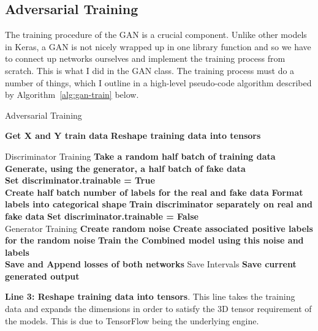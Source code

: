\documentclass[12pt,a4paper,twoside]{report}
\begin{document}
\subsection{Adversarial Training}

The training procedure of the GAN is a crucial component. Unlike other models in Keras, a GAN is not nicely wrapped up in one library function and so we have to connect up networks ourselves and implement the training process from scratch. This is what I did in the GAN class. The training process must do a number of things, which I outline in a high-level pseudo-code algorithm described by Algorithm~\ref{alg:gan-train} below.

\begin{algorithm}[!htbp]
\caption{Adversarial Training }\label{alg:gan-train}
\begin{algorithmic}[1]
	
        \State \textbf{Get X and Y train data}
        \State \textbf{Reshape training data into tensors} 
        \State 
         
		\State
		\Comment Discriminator Training 
		\State \textbf{Take a random half batch of training data}
		\State \textbf{Generate, using the generator, a half batch of fake data}\\
		\State \textbf{Set discriminator.trainable = True}\\
		\State \textbf{Create half batch number of labels for the real and fake data}
		\State \textbf{Format labels into categorical shape}
		\State \textbf{Train discriminator separately on real and fake data}
		\State \textbf{Set discriminator.trainable = False}\\
		\State
		\Comment Generator Training 
		\State \textbf{Create random noise} 
		\State \textbf{Create associated positive labels for the random noise}
		\State \textbf{Train the Combined model using this noise and labels}\\
		\State \textbf{Save and Append losses of both networks }
		\State
		\Comment Save Intervals
			\State \textbf{Save current generated output}
		\EndIf
   	\EndFor
   
\EndProcedure
\end{algorithmic}
\end{algorithm}

\textbf{Line 3: Reshape training data into tensors}. This line takes the training data and expands the dimensions in order to satisfy the 3D tensor requirement of the models. This is due to TensorFlow being the underlying engine. 
\end{document}
